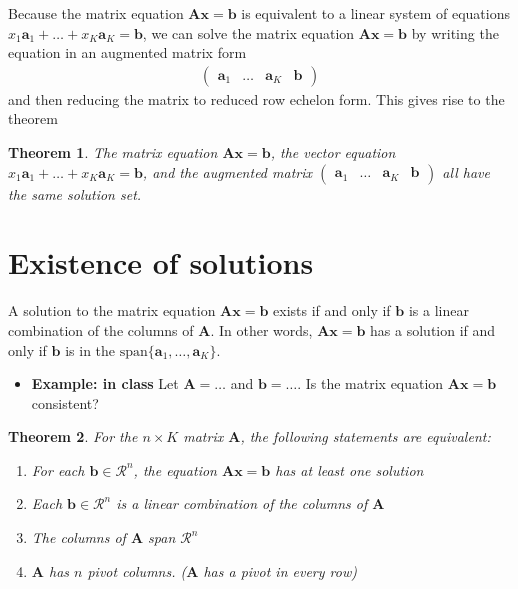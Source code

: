 \documentclass[
]{book}
\providecommand{\tightlist}{%
  \setlength{\itemsep}{0pt}\setlength{\parskip}{0pt}}
\newtheorem{theorem}{Theorem}[chapter]
\theoremstyle{definition}
\theoremstyle{definition}
\theoremstyle{definition}
\theoremstyle{definition}
\theoremstyle{remark}
\begin{document}
Because the matrix equation \(\mathbf{A} \mathbf{x} = \mathbf{b}\) is equivalent to a linear system of equations \(x_1 \mathbf{a}_1 + \ldots + x_K \mathbf{a}_K = \mathbf{b}\), we can solve the matrix equation \(\mathbf{A} \mathbf{x} = \mathbf{b}\) by writing the equation in an augmented matrix form
\[
\begin{aligned}
\begin{pmatrix} \mathbf{a}_1 & \ldots & \mathbf{a}_K & \mathbf{b} \end{pmatrix}
\end{aligned}
\]
and then reducing the matrix to reduced row echelon form. This gives rise to the theorem

\begin{theorem}
The matrix equation \(\mathbf{A} \mathbf{x} = \mathbf{b}\), the vector equation \(x_1 \mathbf{a}_1 + \ldots + x_K \mathbf{a}_K = \mathbf{b}\), and the augmented matrix \(\begin{pmatrix} \mathbf{a}_1 & \ldots & \mathbf{a}_K & \mathbf{b} \end{pmatrix}\) all have the same solution set.
\end{theorem}

\hypertarget{existence-of-solutions}{%
\section{Existence of solutions}\label{existence-of-solutions}}

A solution to the matrix equation \(\mathbf{A} \mathbf{x} = \mathbf{b}\) exists if and only if \(\mathbf{b}\) is a linear combination of the columns of \(\mathbf{A}\). In other words, \(\mathbf{A} \mathbf{x} = \mathbf{b}\) has a solution if and only if \(\mathbf{b}\) is in the \(\mbox{span}\{\mathbf{a}_1, \ldots, \mathbf{a}_K\}\).

\begin{itemize}
\tightlist
\item
  \textbf{Example: in class} Let \(\mathbf{A} =\ldots\) and \(\mathbf{b} = \ldots\). Is the matrix equation \(\mathbf{A} \mathbf{x} = \mathbf{b}\) consistent?
\end{itemize}

\begin{theorem}

For the \(n \times K\) matrix \(\mathbf{A}\), the following statements are equivalent:

\begin{enumerate}
\def\labelenumi{\alph{enumi})}
\item
  For each \(\mathbf{b} \in \mathcal{R}^n\), the equation \(\mathbf{A} \mathbf{x} = \mathbf{b}\) has at least one solution
\item
  Each \(\mathbf{b} \in \mathcal{R}^n\) is a linear combination of the columns of \(\mathbf{A}\)
\item
  The columns of \(\mathbf{A}\) span \(\mathcal{R}^n\)
\item
  \(\mathbf{A}\) has \(n\) pivot columns. (\(\mathbf{A}\) has a pivot in every row)
\end{enumerate}

\end{theorem}
\end{document}
